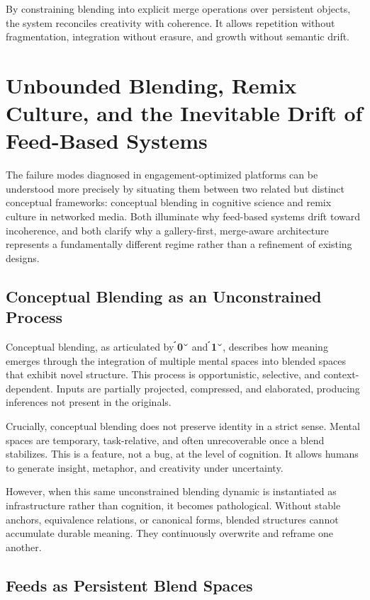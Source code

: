 \documentclass[11pt,oneside]{article}
\begin{document}
By constraining blending into explicit merge operations over persistent objects, the system reconciles creativity with coherence. It allows repetition without fragmentation, integration without erasure, and growth without semantic drift.

\section{Unbounded Blending, Remix Culture, and the Inevitable Drift of Feed-Based Systems}

The failure modes diagnosed in engagement-optimized platforms can be understood more precisely by situating them between two related but distinct conceptual frameworks: conceptual blending in cognitive science and remix culture in networked media. Both illuminate why feed-based systems drift toward incoherence, and both clarify why a gallery-first, merge-aware architecture represents a fundamentally different regime rather than a refinement of existing designs.

\subsection{Conceptual Blending as an Unconstrained Process}

Conceptual blending, as articulated by \textbf{0} and \textbf{1}, describes how meaning emerges through the integration of multiple mental spaces into blended spaces that exhibit novel structure. This process is opportunistic, selective, and context-dependent. Inputs are partially projected, compressed, and elaborated, producing inferences not present in the originals.

Crucially, conceptual blending does not preserve identity in a strict sense. Mental spaces are temporary, task-relative, and often unrecoverable once a blend stabilizes. This is a feature, not a bug, at the level of cognition. It allows humans to generate insight, metaphor, and creativity under uncertainty.

However, when this same unconstrained blending dynamic is instantiated as infrastructure rather than cognition, it becomes pathological. Without stable anchors, equivalence relations, or canonical forms, blended structures cannot accumulate durable meaning. They continuously overwrite and reframe one another.

\subsection{Feeds as Persistent Blend Spaces}
\end{document}
